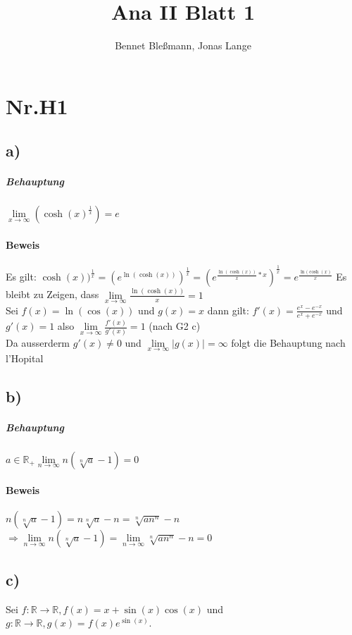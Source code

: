 \documentclass[12pt,a4paper,oneside,ngerman]{article} %
\title{Ana II Blatt 1}
\author{Bennet Bleßmann, Jonas Lange}
\begin{document}
\maketitle
\section*{Nr.H1}
\subsection*{a)}



\subparagraph*{Behauptung}

$\lim\limits_{x \to \infty}(\cosh(x)^{\frac{1}{x}}) = e$

\paragraph*{Beweis}

Es gilt: $\cosh(x))^{\frac{1}{x}} = (e^{\ln(\cosh(x))})^{\frac{1}{x}}
= (e^{\frac {\ln(\cosh(x))}{x}*x})^{\frac{1}{x}} = e^{\frac{\ln(\cosh(x)}{x}}$
Es bleibt zu Zeigen, dass $\lim\limits_{x \to \infty}\frac{\ln(\cosh(x))}{x} = 1 $\\ 
Sei $f(x) = \ln(\cos(x))$ und $g(x)=x$ dann gilt: $f'(x) = \frac{e^{x}-e^{-x}}{e^{x}+e^{-x}} $ und $g'(x) = 1$ also  $\lim\limits_{   x \to \infty} \frac{f'(x)}{g'(x)} = 1 $ (nach G2 c) \\
Da ausserderm $g'(x)\neq 0$ und $ \lim\limits_{x\to\infty} |g(x)| = \infty $ folgt die Behauptung nach l'Hopital

\subsection*{b)}

\subparagraph*{Behauptung}

$a \in \mathbb{R}_{+} \lim\limits_{n \to \infty} n(\sqrt[n]{a}-1) = 0$

\paragraph*{Beweis}

\indent $ n(\sqrt[n]{a}-1) = n\sqrt[n]{a} - n = \sqrt[n]{an^{n}} - n $ \\
\indent $ \Rightarrow \lim\limits_{n \to \infty} n(\sqrt[n]{a}-1) = \lim\limits_{n \to \infty} \sqrt[n]{an^{n}} - n = 0 $



\subsection*{c)}
Sei $ f:\mathbb{R} \to \mathbb{R},f(x) = x + \sin(x)\cos(x) $ und $ g:\mathbb{R} \to \mathbb{R},g(x) = f(x)e^{\sin(x)} $.
\end{document}
